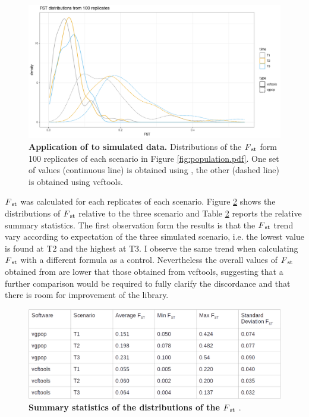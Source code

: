\begin{figure}[H]
\centering
\includegraphics[width=1.00\textwidth]{fig/Fstvcftoolsandvgpop.png}
\decoRule
\caption{\textbf{Application of \vgp to simulated data.} Distributions of the $F\textsubscript{st}$ form 100 replicates of each scenario in Figure \ref{fig:population.pdf}. One set of values (continuous line) is obtained using \vgpop, the other (dashed line) is obtained using  vcftools.  }
\label{fig:fsttime.png}
\end{figure}


$F\textsubscript{st}$ was calculated for each replicates of each scenario. Figure \ref{fig:fsttime.png} shows the distributions of $F\textsubscript{st}$ relative to the three scenario and Table \ref{fig:fsttime.png} reports the relative summary statistics. The first observation form the results is that the $F\textsubscript{st}$ trend vary according to expectation of the three simulated scenario, i.e. the lowest value is found at T2 and the highest at T3. I observe the same trend when calculating $F\textsubscript{st}$ with a different formula as a control. Nevertheless the overall values of $F\textsubscript{st}$ obtained from \vgp are lower that those obtained from vcftools, suggesting that a further comparison would be required to fully clarify the discordance and that there is room for improvement of the \vgp library.  
 
\begin{figure}[H]
\centering
\includegraphics[width=1.00\textwidth]{fig/tabvcftoolsvgpop.png}
\decoRule
\caption{\textbf{Summary statistics of the distributions of the  $F\textsubscript{st}$ }.}
\label{fig:fsttime.png}
\end{figure}



